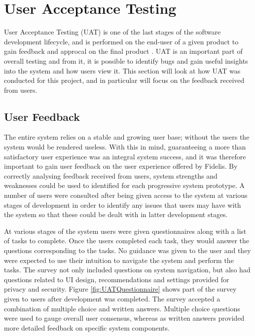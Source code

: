 \section{User Acceptance Testing}
User Acceptance Testing (UAT) is one of the last stages of the software development lifecycle, and is performed on the end-user of a given product to gain feedback and approcal on the final product \cite{EconomicTimes:UAT}. UAT is an important part of overall testing and from it, it is possible to identify bugs and gain useful insights into the system and how users view it. This section will look at how UAT was conducted for this project, and in particular will focus on the feedback received from users.

\subsection{User Feedback}
The entire system relies on a stable and growing user base; without the users the system would be rendered useless. With this in mind, guaranteeing a more than satisfactory user experience was an integral system success, and it was therefore important to gain user feedback on the user experience offered by Fidelis. By correctly analysing feedback received from users, system strengths and weaknesses could be used to identified for each progressive system prototype. A number of users were consulted after being given access to the system at various stages of development in order to identify any issues that users may have with the system so that these could be dealt with in latter development stages.

At various stages of the system users were given questionnaires along with a list of tasks to complete. Once the users completed each task, they would answer the questions corresponding to the tasks. No guidance was given to the user and they were expected to use their intuition to navigate the system and perform the tasks. The survey not only included questions on system navigation, but also had questions related to UI design, recommendations and settings provided for privacy and security. Figure \ref{fig:UATQuestionnaire} shows part of the survey given to users after development was completed. The survey accepted a combination of multiple choice and written answers. Multiple choice questions were used to gauge overall user consensus, whereas as written answers provided more detailed feedback on specific system components.

